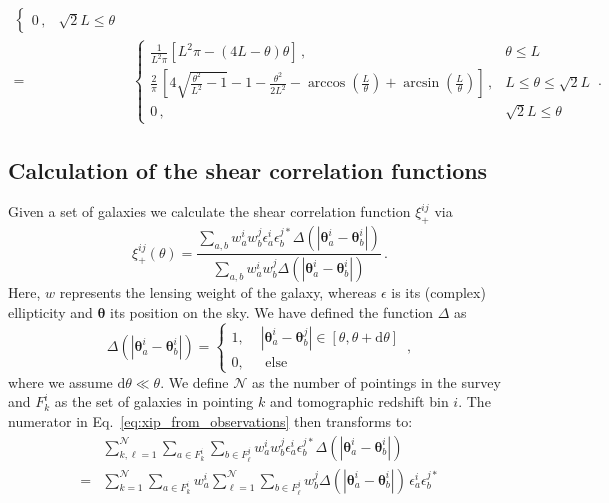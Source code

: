 \documentclass{aa}
\renewcommand{\rm}{\mathrm}
\def\b#1{\bm{#1}}
\begin{document}
\begin{appendix}
\begin{align}
\begin{cases}
0\, , &\sqrt{2}L \leq\theta
\end{cases} \nonumber\\[10pt]
 = & \begin{cases}
\frac{1}{L^2 \pi}\left[L^2\pi - (4L-\theta) \theta\right]\, ,  & \theta \leq L \\[10pt]
\frac{2}{\pi}\,\left[4\sqrt{\frac{\theta^2}{L^2}-1} -1 - \frac{\theta^2}{2L^2} - \arccos\left(\frac{L}{\theta}\right) + \arcsin\left(\frac{L}{\theta}\right)\right]\, ,  & L  \leq \theta \leq \sqrt{2}L \\[10pt]
0\, ,  & \sqrt{2}L \leq \theta
\end{cases}\, .
\end{align}

\subsection{Calculation of the shear correlation functions}
\label{sec:calc of xipm}
Given a set of galaxies we calculate the shear correlation function $\xi_+^{ij}$ via \begin{equation}
\xi^{ij}_+(\theta) = \frac{\sum_{a,b}w_a^iw_b^j\epsilon_a^i\epsilon_b^{j*}\Delta(|\b\theta_a^i-\b\theta_b^i|)}{\sum_{a,b}w_a^iw_b^j\Delta(|\b\theta_a^i-\b\theta_b^i|)}\, .
\label{eq:xip_from_observations}
\end{equation}
Here, $w$ represents the lensing weight of the galaxy, whereas $\epsilon$ is its (complex) ellipticity and $\b \theta$ its position on the sky. We have defined the function $\Delta$ as \begin{equation}
\Delta(|\b\theta_a^i-\b\theta_b^i|) = \begin{cases}
1, \,\, & |\b\theta_a^i-\b\theta_b^j| \in [\theta,\theta+{\rm d}\theta] \\
0, & \text{ else}
\end{cases}\, ,
\end{equation}
where we assume ${\rm d}\theta \ll \theta$. We define $\mathcal{N}$ as the number of pointings in the survey and $F_k^i$ as the set of galaxies in pointing $k$ and tomographic redshift bin $i$. The numerator in Eq.~\eqref{eq:xip_from_observations} then transforms to: \begin{align}
& \sum_{k,\ell=1}^\mathcal{N} \sum_{a\in F_k^i}\sum_{b\in F_{\ell}^j} w_a^iw_b^j\epsilon_a^i\epsilon_b^{j*} \Delta(|\b\theta_a^i-\b\theta_b^i|) \nonumber\\
 = & \sum_{k=1}^\mathcal{N}\sum_{a\in F_k^i}w_a^i \sum_{\ell=1}^\mathcal{N} \sum_{b\in F_{\ell}^j} w_b^j \Delta(|\b\theta_a^i-\b\theta_b^i|)\, \epsilon_a^i\epsilon_b^{j*} \nonumber\\

\end{align}
\end{appendix}
\end{document}
